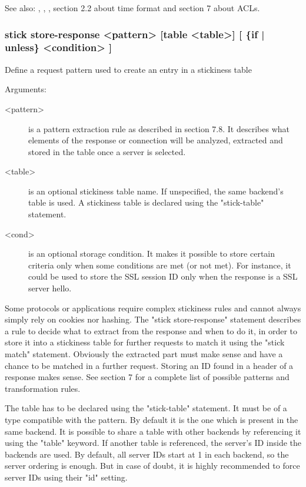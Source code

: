   See also: , , , section 2.2
             about time format and section 7 about ACLs.

\subsubsection[stick store-response]{stick store-response <pattern> [table <table>] [ \{if | unless\} <condition> ]}


  Define a request pattern used to create an entry in a stickiness table
  

  Arguments:
  \begin{description}
  \item[<pattern>] is a pattern extraction rule as described in section 7.8. It
               describes what elements of the response or connection will
               be analyzed, extracted and stored in the table once a
               server is selected.

  \item[<table>] is an optional stickiness table name. If unspecified, the same
               backend's table is used. A stickiness table is declared using
               the "stick-table" statement.

  \item[<cond>] is an optional storage condition. It makes it possible to store
               certain criteria only when some conditions are met (or not met).
               For instance, it could be used to store the SSL session ID only
               when the response is a SSL server hello.
  \end{description}

  Some protocols or applications require complex stickiness rules and cannot
  always simply rely on cookies nor hashing. The "stick store-response"
  statement  describes a rule to decide what to extract from the response and
  when to do it, in order to store it into a stickiness table for further
  requests to match it using the "stick match" statement. Obviously the
  extracted part must make sense and have a chance to be matched in a further
  request. Storing an ID found in a header of a response makes sense.
  See section 7 for a complete list of possible patterns and transformation
  rules.

  The table has to be declared using the "stick-table" statement. It must be of
  a type compatible with the pattern. By default it is the one which is present
  in the same backend. It is possible to share a table with other backends by
  referencing it using the "table" keyword. If another table is referenced,
  the server's ID inside the backends are used. By default, all server IDs
  start at 1 in each backend, so the server ordering is enough. But in case of
  doubt, it is highly recommended to force server IDs using their "id" setting.


